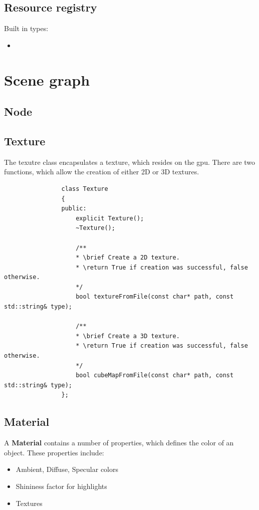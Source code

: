 \documentclass[12p, paper=a4, leqno, colorinlistoftodos]{article}
\begin{document}
		\subsection{Resource registry}
		Built in types:
		\begin{itemize}
			\item 
		\end{itemize}
		
	\pagebreak
	\section{Scene graph}
		\subsection{Node}
			
				
		\subsection{Texture}
			The texutre class encapsulates a texture, which resides on the gpu. There are two functions, which allow the creation of either 2D or 3D textures.			
			\begin{lstlisting}
				class Texture
				{
				public:
					explicit Texture();
					~Texture();
					
					/**
					* \brief Create a 2D texture.
					* \return True if creation was successful, false otherwise.
					*/
					bool textureFromFile(const char* path, const std::string& type);
					
					/** 
					* \brief Create a 3D texture.
					* \return True if creation was successful, false otherwise.
					*/
					bool cubeMapFromFile(const char* path, const std::string& type);
				};	
			\end{lstlisting}
		
		\subsection{Material}
			A \textbf{Material} contains a number of properties, which defines the color of an object. These properties include:
			\begin{itemize}
				\item Ambient, Diffuse, Specular colors
				\item Shininess factor for highlights
				\item Textures
			\end{itemize}
			\begin{lstlisting}
				
			\end{lstlisting}	
		
\end{document}
